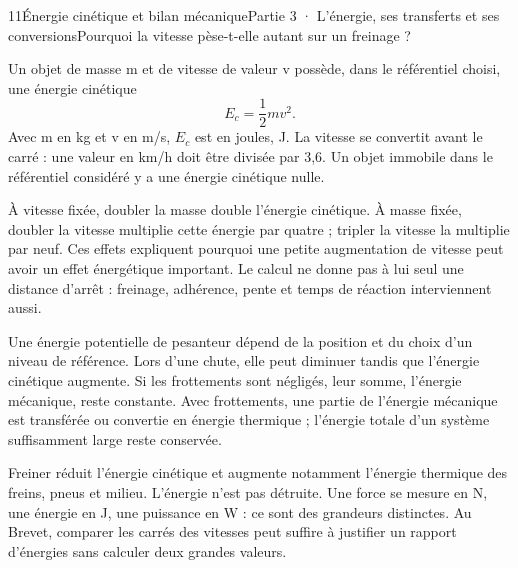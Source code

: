 \begin{ouverture}[college3]{11}{Énergie cinétique et bilan mécanique}{Partie 3 · L’énergie, ses transferts et ses conversions}{Pourquoi la vitesse pèse-t-elle autant sur un freinage ?}
\end{ouverture}
\label{ess-11}
Un objet de masse m et de vitesse de valeur v possède, dans le référentiel choisi, une énergie cinétique \[E_c=\dfrac12 mv^2.\] Avec m en kg et v en m/s, $E_c$ est en joules, J. La vitesse se convertit avant le carré : une valeur en km/h doit être divisée par 3,6. Un objet immobile dans le référentiel considéré y a une énergie cinétique nulle.\par
{}
À vitesse fixée, doubler la masse double l’énergie cinétique. À masse fixée, doubler la vitesse multiplie cette énergie par quatre ; tripler la vitesse la multiplie par neuf. Ces effets expliquent pourquoi une petite augmentation de vitesse peut avoir un effet énergétique important. Le calcul ne donne pas à lui seul une distance d’arrêt : freinage, adhérence, pente et temps de réaction interviennent aussi.\par
\clearpage
{}
Une énergie potentielle de pesanteur dépend de la position et du choix d’un niveau de référence. Lors d’une chute, elle peut diminuer tandis que l’énergie cinétique augmente. Si les frottements sont négligés, leur somme, l’énergie mécanique, reste constante. Avec frottements, une partie de l’énergie mécanique est transférée ou convertie en énergie thermique ; l’énergie totale d’un système suffisamment large reste conservée.\par
{}
Freiner réduit l’énergie cinétique et augmente notamment l’énergie thermique des freins, pneus et milieu. L’énergie n’est pas détruite. Une force se mesure en N, une énergie en J, une puissance en W : ce sont des grandeurs distinctes. Au Brevet, comparer les carrés des vitesses peut suffire à justifier un rapport d’énergies sans calculer deux grandes valeurs.\par
